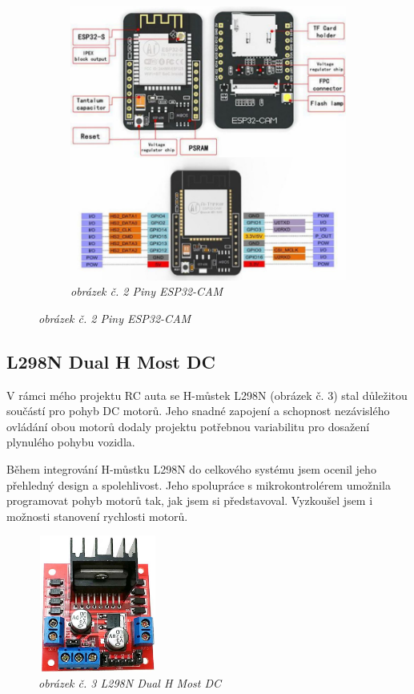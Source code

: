 \documentclass[12pt, a4paper,
oneside,      %
openany
]{report}
\begin{document}
\begin{figure}[h]
\begin{subfigure}{0.48\textwidth}
        \includegraphics[width=\textwidth]{image/esp32-pins.png}
        \caption*{\textit{obrázek č. 2 Piny ESP32-CAM}}
        \label{fig:esp32Pins}
    \end{subfigure}     
\end{figure}

\subsection{L298N Dual H Most DC}
    \noindent V rámci mého projektu RC auta se H-můstek L298N (obrázek č. 3) stal důležitou součástí pro pohyb DC motorů. Jeho snadné zapojení a schopnost nezávislého ovládání obou motorů dodaly projektu potřebnou variabilitu pro dosažení plynulého pohybu vozidla.

    \noindent Během integrování H-můstku L298N do celkového systému jsem ocenil jeho přehledný design a spolehlivost. Jeho spolupráce s mikrokontrolérem umožnila programovat pohyb motorů tak, jak jsem si představoval. Vyzkoušel jsem i možnosti stanovení rychlosti motorů.
    \begin{figure}[H]
        \centering
		\includegraphics[width=0.35\textwidth, height=4.5cm]{image/Hmustek.png}
        \caption*{\textit{obrázek č. 3 L298N Dual H Most DC}}
        \label{fig:hMustek}
    \end{figure}
\end{document}
